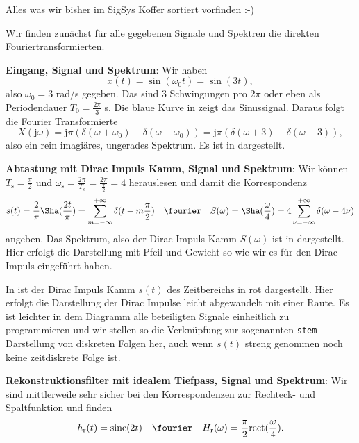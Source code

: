 \begin{Werkzeug}
Alles was wir bisher im SigSys Koffer sortiert vorfinden :-)
\end{Werkzeug}
\begin{Ansatz}
Wir finden zunächst für alle gegebenen Signale und Spektren die direkten
Fouriertransformierten.

\textbf{Eingang, Signal und Spektrum}:
Wir haben
\begin{equation}
x(t) = \sin(\omega_0 t) = \sin(3 t),
\end{equation}
also  $\omega_0=3$ rad/s gegeben. Das sind 3 Schwingungen pro $2\pi$ oder eben
als Periodendauer $T_0 = \frac{2\pi}{3}$ s.
Die blaue Kurve in  zeigt das Sinussignal.
Daraus folgt die Fourier Transformierte
\begin{equation}
X(\mathrm{j} \omega) =
\mathrm{j} \pi \left( \delta(\omega+\omega_0) - \delta(\omega-\omega_0) \right) =
\mathrm{j} \pi \left( \delta(\omega+3) - \delta(\omega-3) \right),
\end{equation}
also ein rein imagiäres, ungerades Spektrum. Es ist in 
dargestellt.

\textbf{Abtastung mit Dirac Impuls Kamm, Signal und Spektrum}:
Wir können $T_\mathrm{s} = \frac{\pi}{2}$ und
$\omega_\mathrm{s} = \frac{2 \pi}{T_\mathrm{s}} = \frac{2 \pi}{\frac{\pi}{2}} = 4$
herauslesen und damit die Korrespondenz
\begin{equation}
s(t) = \frac{2}{\pi} {\Sha}(\frac{2 t}{\pi}) =
\sum_{m=-\infty}^{+\infty} \delta(t-m \frac{\pi}{2})
\quad\fourier\quad
S(\omega) = {\Sha}(\frac{\omega}{4}) =
4 \sum_{\nu=-\infty}^{+\infty} \delta(\omega-4 \nu)
\end{equation}
angeben. Das Spektrum, also der Dirac Impuls Kamm $S(\omega)$
ist in 
dargestellt. Hier erfolgt die Darstellung mit Pfeil und Gewicht so wie wir es
für den Dirac Impuls eingeführt haben.

In  ist der Dirac Impuls Kamm $s(t)$ des Zeitbereichs
in rot dargestellt. Hier erfolgt die Darstellung der Dirac Impulse leicht abgewandelt
mit einer Raute. Es ist leichter in dem Diagramm alle beteiligten Signale einheitlich
zu programmieren und wir stellen so die Verknüpfung zur sogenannten
\texttt{stem}-Darstellung von diskreten Folgen her, auch wenn $s(t)$ streng genommen
noch keine zeitdiskrete Folge ist.

\textbf{Rekonstruktionsfilter mit idealem Tiefpass, Signal und Spektrum}:
Wir sind mittlerweile sehr sicher bei den Korrespondenzen zur Rechteck- und
Spaltfunktion und finden
\begin{equation}
h_\mathrm{r}(t) = \mathrm{sinc}(2 t) \quad\fourier\quad
H_\mathrm{r}(\omega) = \frac{\pi}{2}\mathrm{rect}(\frac{\omega}{4}).
\end{equation}


\end{Ansatz}
